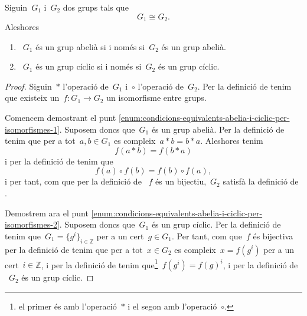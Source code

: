 \documentclass[../estructures-algebraiques.tex]{subfiles}
\begin{document}
    \begin{proposition}
        \label{prop:condicions-equivalents-abelia-i-ciclic-per-isomorfismes}
        Siguin~\(G_{1}\) i~\(G_{2}\) dos grups tals que
        \[
            G_{1}\cong G_{2}.
        \]
        Aleshores
        \begin{enumerate}
            \item\label{enum:condicions-equivalents-abelia-i-ciclic-per-isomorfismes-1}~\(G_{1}\) és un grup abelià si i només si~\(G_{2}\) és un grup abelià.
            \item\label{enum:condicions-equivalents-abelia-i-ciclic-per-isomorfismes-2}~\(G_{1}\) és un grup cíclic si i només si~\(G_{2}\) és un grup cíclic.
        \end{enumerate}
    \end{proposition}
    \begin{proof}
        Siguin~\(\ast\) l'operació de~\(G_{1}\) i~\(\circ\) l'operació de~\(G_{2}\).
        Per la definició de  tenim que existeix un~\(f\colon G_{1}\to G_{2}\) un isomorfisme entre grups.

        Comencem demostrant el punt \eqref{enum:condicions-equivalents-abelia-i-ciclic-per-isomorfismes-1}.
        Suposem doncs que~\(G_{1}\) és un grup abelià.
        Per la definició de  tenim que per a tot~\(a,b\in G_{1}\) es compleix~\(a\ast b=b\ast a\).
        Aleshores tenim
        \[
            f(a\ast b)=f(b\ast a)
        \]
        i per la definició de  tenim que
        \[
            f(a)\circ f(b)=f(b)\circ f(a),
        \]
        i per tant, com que per la definició de ~\(f\) és un bijectiu,~\(G_{2}\) satisfà la definició de .

        Demostrem ara el punt \eqref{enum:condicions-equivalents-abelia-i-ciclic-per-isomorfismes-2}.
        Suposem doncs que~\(G_{1}\) és un grup cíclic.
        Per la definició de  tenim que~\(G_{1}=\{g^{i}\}_{i\in\mathbb{Z}}\) per a un cert~\(g\in G_{1}\).
        Per tant, com que~\(f\) és bijectiva per la definició de  tenim que per a tot~\(x\in G_{2}\) es compleix~\(x=f(g^{i})\) per a un cert~\(i\in\mathbb{Z}\), i per la definició de  tenim que\footnote{el primer és amb l'operació~\(\ast\) i el segon amb l'operació~\(\circ\).}~\(f(g^{i})=f(g)^{i}\), i per la definició de ~\(G_{2}\) és un grup cíclic.
    \end{proof}
\end{document}
